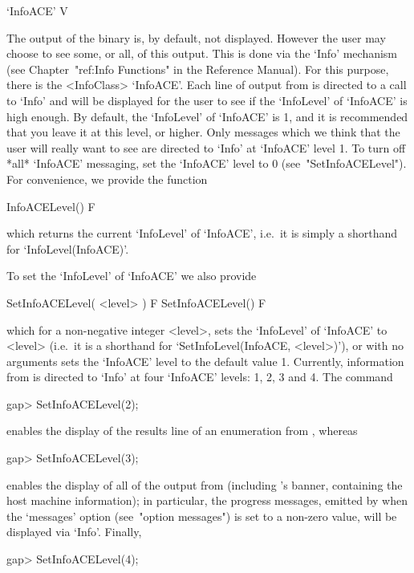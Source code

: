 
\>`InfoACE' V

The output of the {\ACE} binary is, by default, not displayed. However
the user may choose to see some, or all, of this output. This is  done
via the `Info' mechanism  (see  Chapter~"ref:Info  Functions"  in  the
{\GAP} Reference Manual). For this purpose, there is  the  <InfoClass>
`InfoACE'. Each line of output from {\ACE} is directed to  a  call  to
`Info' and will be displayed for the user to see if the `InfoLevel' of
`InfoACE' is high enough. By default, the `InfoLevel' of `InfoACE'  is
1, and it is recommended that you leave it at this level,  or  higher.
Only messages which we think that the user will really want to see are
directed to `Info' at `InfoACE' level 1. To turn off  *all*  `InfoACE'
messaging, set the `InfoACE' level to 0  (see~"SetInfoACELevel").  For
convenience, we provide the function

\>InfoACELevel() F

which returns the current `InfoLevel' of `InfoACE', i.e.~it is  simply
a shorthand for `InfoLevel(InfoACE)'.

To set the `InfoLevel' of `InfoACE' we also provide

\>SetInfoACELevel( <level> ) F
\>SetInfoACELevel() F

which for a non-negative integer  <level>,  sets  the  `InfoLevel'  of
`InfoACE'    to    <level>    (i.e.~it    is    a    shorthand     for
`SetInfoLevel(InfoACE, <level>)'),  or  with  no  arguments  sets  the
`InfoACE' level to the default value 1.  Currently,  information  from
{\ACE} is directed to `Info' at four `InfoACE' levels: 1, 2, 3 and  4.
The command

\beginexample
gap> SetInfoACELevel(2);
\endexample

enables the display of the results line of an enumeration from {\ACE},
whereas

\beginexample
gap> SetInfoACELevel(3);
\endexample

enables the display of  all  of  the  output  from  {\ACE}  (including
{\ACE}'s  banner,  containing  the  host  machine   information);   in
particular,  the  progress  messages,  emitted  by  {\ACE}  when   the
`messages' option (see~"option messages") is set to a non-zero  value,
will be displayed via `Info'. Finally,

\beginexample
gap> SetInfoACELevel(4);
\endexample

